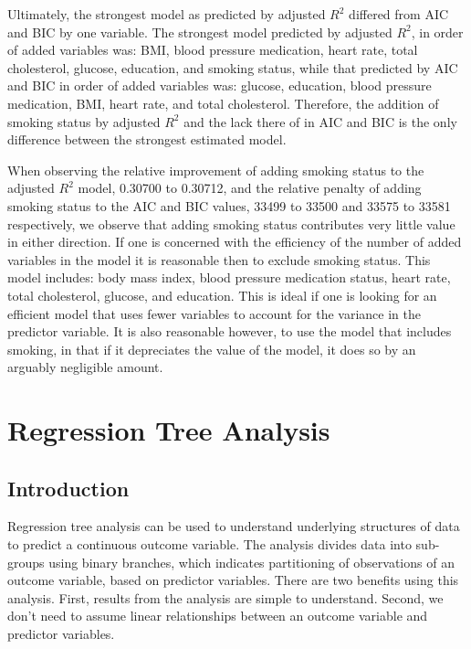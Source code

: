 \documentclass{article}\usepackage[]{graphicx}\usepackage[]{color}
\begin{document}
Ultimately, the strongest model as predicted by adjusted $R^2$ differed from AIC and BIC by one variable. The strongest model predicted by adjusted $R^2$, in order of added variables was: BMI, blood pressure medication, heart rate, total cholesterol, glucose, education, and smoking status, while that predicted by AIC and BIC in order of added variables was: glucose, education, blood pressure medication, BMI, heart rate, and total cholesterol. Therefore, the addition of smoking status by adjusted $R^2$ and the lack there of in AIC and BIC is the only difference between the strongest estimated model. 

When observing the relative improvement of adding smoking status to the adjusted $R^2$ model, 0.30700 to 0.30712, and the relative penalty of adding smoking status to the AIC and BIC values, 33499 to 33500 and 33575 to 33581 respectively, we observe that adding smoking status contributes very little value in either direction.  If one is concerned with the efficiency of the number of added variables in the model it is reasonable then to exclude smoking status. This model includes: body mass index, blood pressure medication status, heart rate, total cholesterol, glucose, and education.  This is ideal if one is looking for an efficient model that uses fewer variables to account for the variance in the predictor variable.  It is also reasonable however, to use the model that includes smoking, in that if it depreciates the value of the model, it does so by an arguably negligible amount.

\section{Regression Tree Analysis}
\subsection{Introduction}

  Regression tree analysis can be used to understand underlying structures of data to predict a continuous outcome variable. The analysis divides data into sub-groups using binary branches, which indicates partitioning of observations of an outcome variable, based on predictor variables. 
  There are two benefits using this analysis. First, results from the analysis are simple to understand. Second, we don't need to assume linear relationships between an outcome variable and predictor variables.
\end{document}
